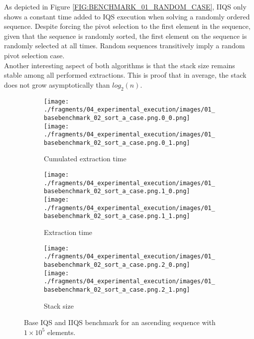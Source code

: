 As depicted in Figure \ref{FIG:BENCHMARK_01_RANDOM_CASE}, IIQS only shows a constant time added to IQS execution when solving a randomly ordered sequence. Despite forcing the pivot selection to the first element in the sequence, given that the sequence is randomly sorted, the first element on the sequence is randomly selected at all times. Random sequences transitively imply a random pivot selection case.\\

Another interesting aspect of both algorithms is that the stack size remains stable among all performed extractions. This is proof that in average, the stack does not grow asymptotically than $log_2(n)$.\\

\begin{figure}
    \centering
    \begin{subfigure}[b]{\textwidth}
        \centering
        \texttt{[image: ./fragments/04\_experimental\_execution/images/01\_basebenchmark\_02\_sort\_a\_case.png.0\_0.png]}
        \texttt{[image: ./fragments/04\_experimental\_execution/images/01\_basebenchmark\_02\_sort\_a\_case.png.0\_1.png]}
        \caption{Cumulated extraction time}
        \label{FIG:BENCHMARK_02_ASC_CASE__0_0}
    \end{subfigure}

    \begin{subfigure}[b]{\textwidth}
        \centering
        \texttt{[image: ./fragments/04\_experimental\_execution/images/01\_basebenchmark\_02\_sort\_a\_case.png.1\_0.png]}
        \texttt{[image: ./fragments/04\_experimental\_execution/images/01\_basebenchmark\_02\_sort\_a\_case.png.1\_1.png]}
        \caption{Extraction time}
        \label{FIG:BENCHMARK_02_ASC_CASE__0_1}
    \end{subfigure}

    \begin{subfigure}[b]{\textwidth}
        \centering
        \texttt{[image: ./fragments/04\_experimental\_execution/images/01\_basebenchmark\_02\_sort\_a\_case.png.2\_0.png]}
        \texttt{[image: ./fragments/04\_experimental\_execution/images/01\_basebenchmark\_02\_sort\_a\_case.png.2\_1.png]}
        \caption{Stack size}
        \label{FIG:BENCHMARK_02_ASC_CASE__0_2}
    \end{subfigure}
    
    \caption{Base IQS and IIQS benchmark for an ascending sequence with $1\times10^5$ elements.}
    \label{FIG:BENCHMARK_02_ASC_CASE}
\end{figure}

